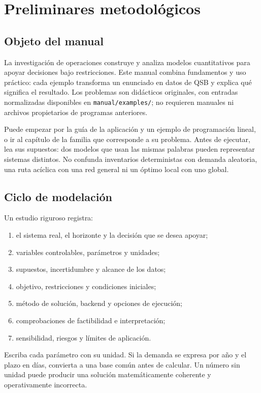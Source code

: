 \chapter{Preliminares metodológicos}
\label{chap:preliminares}

\section{Objeto del manual}
La investigación de operaciones construye y analiza modelos cuantitativos para
apoyar decisiones bajo restricciones. Este manual combina fundamentos y uso
práctico: cada ejemplo transforma un enunciado en datos de QSB y explica qué
significa el resultado. Los problemas son didácticos originales, con entradas
normalizadas disponibles en \texttt{manual/examples/}; no requieren manuales ni
archivos propietarios de programas anteriores.

Puede empezar por la guía de la aplicación y un ejemplo de programación lineal,
o ir al capítulo de la familia que corresponde a su problema. Antes de ejecutar,
lea sus supuestos: dos modelos que usan las mismas palabras pueden representar
sistemas distintos. No confunda inventarios deterministas con demanda aleatoria,
una ruta acíclica con una red general ni un óptimo local con uno global.

\section{Ciclo de modelación}
Un estudio riguroso registra:
\begin{enumerate}
 \item el sistema real, el horizonte y la decisión que se desea apoyar;
 \item variables controlables, parámetros y unidades;
 \item supuestos, incertidumbre y alcance de los datos;
 \item objetivo, restricciones y condiciones iniciales;
 \item método de solución, backend y opciones de ejecución;
 \item comprobaciones de factibilidad e interpretación;
 \item sensibilidad, riesgos y límites de aplicación.
\end{enumerate}
Escriba cada parámetro con su unidad. Si la demanda se expresa por año y el plazo
en días, convierta a una base común antes de calcular. Un número sin unidad puede
producir una solución matemáticamente coherente y operativamente incorrecta.

